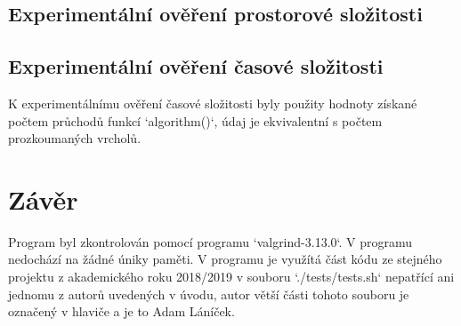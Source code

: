 \documentclass[a4paper,11pt]{article}
\begin{document}

\newpage
\subsection{Experimentální ověření prostorové složitosti}

\begin{figure}[h]
\centering
{}
\end{figure}


\subsection{Experimentální ověření časové složitosti}

K experimentálnímu ověření časové složitosti byly použity hodnoty získané počtem průchodů funkcí `algorithm()`, údaj je ekvivalentní s počtem prozkoumaných vrcholů.

\begin{figure}[h]
\centering
{}
\end{figure}
\newpage
\section{Závěr}

Program byl zkontrolován pomocí programu `valgrind-3.13.0`. V programu nedochází na žádné úniky paměti. V programu je využítá část kódu ze stejného projektu z akademického roku 2018/2019 v souboru `./tests/tests.sh` nepatřící ani jednomu z autorů uvedených v úvodu, autor větší části tohoto souboru je označený v hlaviče a je to Adam Láníček.






\end{document}
